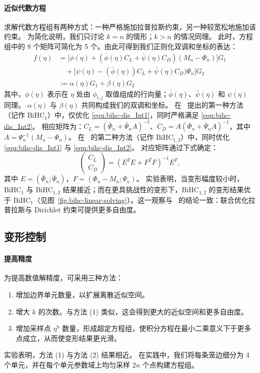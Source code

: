 \paragraph{近似代数方程}
求解代数方程组有两种方式：一种严格施加拉普拉斯约束，另一种较宽松地施加该约束。
为简化说明，我们只讨论 \(k=n\) 的情形；\(k>n\) 的情况同理。
此时，方程组中的 8 个矩阵可简化为 5 个。由此可得到我们正则化双调和坐标的表达：
\begin{equation}\label{equ:bihc-final_BHC}
    \begin{aligned}
f(\eta) &= \big[ \phi(\eta) + (\bar{\phi}(\eta) C_L + \bar{\psi}(\eta) C_D)(M_n - \Phi_n) \big] G_1 \\
&\quad + \big[ \psi(\eta) - (\bar{\phi}(\eta)) C_L + \bar{\psi}(\eta) C_D)\Psi_n \big] G_2  \\
&:=\alpha(\eta)G_1+\beta(\eta)G_2
\end{aligned}
\end{equation}
其中，\(\phi(\eta)\) 表示在 \(\eta\) 处由 \(\phi_{i,j}\) 取值组成的行向量；\(\bar{\phi}(\eta)\)、\(\bar{\psi}(\eta)\) 和 \(\psi(\eta)\) 同理。
\(\alpha(\eta)\) 与 \(\beta(\eta)\) 共同构成我们的双调和坐标。
在~\cite{Weber2012} 提出的第一种方法（记作 $\text{BiHC}_1$）中，仅优化 \eqref{equ:bihc-dis_Int1}，同时严格满足 \eqref{equ:bihc-dis_Int2}。
相应矩阵为：\(C_L = (\bar{\Phi}_n + \bar{\Psi}_n A)^{-1}\)、\(C_D = A (\bar{\Phi}_n + \bar{\Psi}_n A)^{-1}\)，其中 \(A = \Psi_n^{-1} (M_n - \Phi_n)\)。
%
在~\cite{thiery2024biharmonic} 的第二种方法（记作 $\text{BiHC}_{1,2}$）中，同时优化 \eqref{equ:bihc-dis_Int1} 与 \eqref{equ:bihc-dis_Int2}。
对应矩阵通过下式确定：
\[
\begin{pmatrix}
C_L \\
C_D
\end{pmatrix} = \left( E^T E + F^T F \right)^{-1} E^T,
\]
其中 \(E = (\bar{\Phi}_n; \bar{\Psi}_n)\)，\(F = (\Phi_n - M_n; \Psi_n)\)。
实验表明，当变形幅度较小时，$\text{BiHC}_{1}$ 与 $\text{BiHC}_{1,2}$ 结果接近；而在更具挑战性的变形下，$\text{BiHC}_{1,2}$ 的变形结果优于 $\text{BiHC}_{1}$（见图~\ref{fig:bihc-linear-solving}）。这一观察与~\cite{thiery2024biharmonic} 的结论一致：联合优化拉普拉斯与 Dirichlet 约束可提供更多自由度。


\subsection{变形控制}\label{sec:bihc-deformation}

\paragraph{提高精度}
为提高数值解精度，可采用三种方法：
\begin{enumerate}
    \item 增加边界单元数量，以扩展离散近似空间。
    \item 增大 \(k\) 的次数。与方法 (1) 类似，这会得到更大的近似空间和更多自由度。
    \item 增加采样点 \(\eta^\text{b}\) 数量，形成超定方程组，使积分方程在最小二乘意义下于更多点成立，从而使变形结果更光滑。
\end{enumerate}
实验表明，方法 (1) 与方法 (2) 结果相近。
在实践中，我们将每条笼边细分为 4 个单元，并在每个单元参数域上均匀采样 \(2n\) 个点构建方程组。

